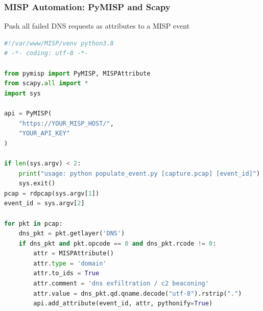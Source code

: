 \begin{frame}[fragile]
    \frametitle{MISP Automation: PyMISP and Scapy}
    Push all failed DNS requests as attributes to a MISP event
    \begin{lstlisting}[basicstyle=\tiny\color{black},language=Python]
#!/var/www/MISP/venv python3.8
# -*- coding: utf-8 -*-

from pymisp import PyMISP, MISPAttribute
from scapy.all import *
import sys

api = PyMISP(
    "https://YOUR_MISP_HOST/",
    "YOUR_API_KEY"
)

if len(sys.argv) < 2:
    print("usage: python populate_event.py [capture.pcap] [event_id]")
    sys.exit()
pcap = rdpcap(sys.argv[1])
event_id = sys.argv[2]

for pkt in pcap:
    dns_pkt = pkt.getlayer('DNS')
    if dns_pkt and pkt.opcode == 0 and dns_pkt.rcode != 0:
        attr = MISPAttribute()
        attr.type = 'domain'
        attr.to_ids = True
        attr.comment = 'dns exfiltration / c2 beaconing'
        attr.value = dns_pkt.qd.qname.decode("utf-8").rstrip(".")
        api.add_attribute(event_id, attr, pythonify=True)
	\end{lstlisting}
\end{frame}


